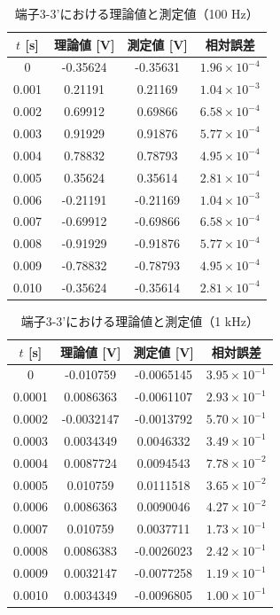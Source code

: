 \documentclass[article]{jlreq}
\begin{document}
\begin{table}[H]
\centering
\caption{端子3-3'における理論値と測定値（100 Hz）}
\begin{tabular}{cccc}
\toprule
$t$ [s] & 理論値 [V] & 測定値 [V] & 相対誤差 \\
\midrule
0     & -0.35624 & -0.35631 & $1.96\times10^{-4}$ \\
0.001 & 0.21191  & 0.21169  & $1.04\times10^{-3}$ \\
0.002 & 0.69912  & 0.69866  & $6.58\times10^{-4}$ \\
0.003 & 0.91929  & 0.91876  & $5.77\times10^{-4}$ \\
0.004 & 0.78832  & 0.78793  & $4.95\times10^{-4}$ \\
0.005 & 0.35624  & 0.35614  & $2.81\times10^{-4}$ \\
0.006 & -0.21191 & -0.21169 & $1.04\times10^{-3}$ \\
0.007 & -0.69912 & -0.69866 & $6.58\times10^{-4}$ \\
0.008 & -0.91929 & -0.91876 & $5.77\times10^{-4}$ \\
0.009 & -0.78832 & -0.78793 & $4.95\times10^{-4}$ \\
0.010 & -0.35624 & -0.35614 & $2.81\times10^{-4}$ \\
\bottomrule
\end{tabular}
\end{table}


\begin{table}[H]
\centering
\caption{端子3-3'における理論値と測定値（1 kHz）}
\begin{tabular}{cccc}
\toprule
$t$ [s] & 理論値 [V] & 測定値 [V] & 相対誤差 \\
\midrule
0      & -0.010759  & -0.0065145 & $3.95\times10^{-1}$ \\
0.0001 & 0.0086363  & -0.0061107 & $2.93\times10^{-1}$ \\
0.0002 & -0.0032147 & -0.0013792 & $5.70\times10^{-1}$ \\
0.0003 & 0.0034349  & 0.0046332  & $3.49\times10^{-1}$ \\
0.0004 & 0.0087724  & 0.0094543  & $7.78\times10^{-2}$ \\
0.0005 & 0.010759   & 0.0111518  & $3.65\times10^{-2}$ \\
0.0006 & 0.0086363  & 0.0090046  & $4.27\times10^{-2}$ \\
0.0007 & 0.010759   & 0.0037711  & $1.73\times10^{-1}$ \\
0.0008 & 0.0086383  & -0.0026023 & $2.42\times10^{-1}$ \\
0.0009 & 0.0032147  & -0.0077258 & $1.19\times10^{-1}$ \\
0.0010 & 0.0034349  & -0.0096805 & $1.00\times10^{-1}$ \\
\bottomrule
\end{tabular}
\end{table}
\end{document}
